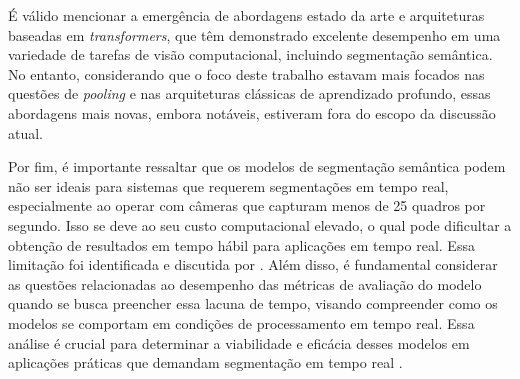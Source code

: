 É válido mencionar a emergência de abordagens estado da arte e arquiteturas baseadas em \textit{transformers}, que têm demonstrado excelente desempenho em uma variedade de tarefas de visão computacional, incluindo segmentação semântica. No entanto, considerando que o foco deste trabalho estavam mais focados nas questões de \textit{pooling} e nas arquiteturas clássicas de aprendizado profundo, essas abordagens mais novas, embora notáveis, estiveram fora do escopo da discussão atual.

Por fim, é importante ressaltar que os modelos de segmentação semântica podem não ser ideais para sistemas que requerem segmentações em tempo real, especialmente ao operar com câmeras que capturam menos de 25 quadros por segundo. Isso se deve ao seu custo computacional elevado, o qual pode dificultar a obtenção de resultados em tempo hábil para aplicações em tempo real. Essa limitação foi identificada e discutida por \cite{Minaee2021}. Além disso, é fundamental considerar as questões relacionadas ao desempenho das métricas de avaliação do modelo quando se busca preencher essa lacuna de tempo, visando compreender como os modelos se comportam em condições de processamento em tempo real. Essa análise é crucial para determinar a viabilidade e eficácia desses modelos em aplicações práticas que demandam segmentação em tempo real \citep{badrinarayanan2017segnet}.